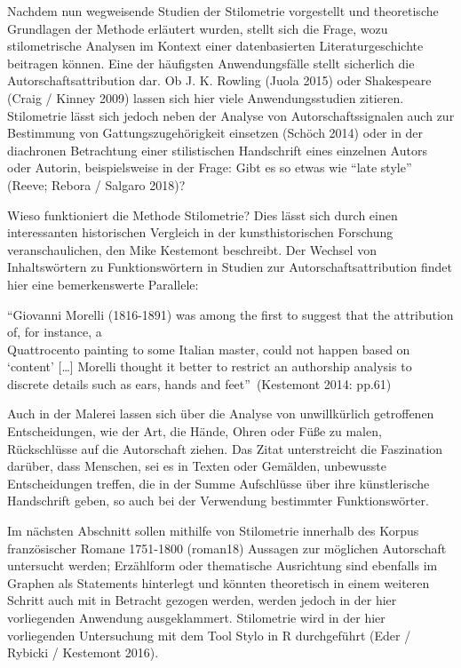 \documentclass[
  12pt,
  letterpaper,
  DIV=11,
  numbers=noendperiod]{scrreprt}
\begin{document}
Nachdem nun wegweisende Studien der Stilometrie vorgestellt und
theoretische Grundlagen der Methode erläutert wurden, stellt sich die
Frage, wozu stilometrische Analysen im Kontext einer datenbasierten
Literaturgeschichte beitragen können. Eine der häufigsten
Anwendungsfälle stellt sicherlich die Autorschaftsattribution dar. Ob J.
K. Rowling (Juola 2015) oder Shakespeare (Craig / Kinney 2009) lassen
sich hier viele Anwendungsstudien zitieren.\\
Stilometrie lässt sich jedoch neben der Analyse von Autorschaftssignalen
auch zur Bestimmung von Gattungszugehörigkeit einsetzen (Schöch 2014)
oder in der diachronen Betrachtung einer stilistischen Handschrift eines
einzelnen Autors oder Autorin, beispielsweise in der Frage: Gibt es so
etwas wie ``late style'' (Reeve; Rebora / Salgaro 2018)?

Wieso funktioniert die Methode Stilometrie? Dies lässt sich durch einen
interessanten historischen Vergleich in der kunsthistorischen Forschung
veranschaulichen, den Mike Kestemont beschreibt. Der Wechsel von
Inhaltswörtern zu Funktionswörtern in Studien zur
Autorschaftsattribution findet hier eine bemerkenswerte Parallele:

``Giovanni Morelli (1816-1891) was among the first to suggest that the
attribution of, for instance, a\\
Quattrocento painting to some Italian master, could not happen based on
`content' {[}\ldots{]} Morelli thought it better to restrict an
authorship analysis to discrete details such as ears, hands and
feet''~(Kestemont 2014: pp.61)

Auch in der Malerei lassen sich über die Analyse von unwillkürlich
getroffenen Entscheidungen, wie der Art, die Hände, Ohren oder Füße zu
malen, Rückschlüsse auf die Autorschaft ziehen. Das Zitat unterstreicht
die Faszination darüber, dass Menschen, sei es in Texten oder Gemälden,
unbewusste Entscheidungen treffen, die in der Summe Aufschlüsse über
ihre künstlerische Handschrift geben, so auch bei der Verwendung
bestimmter Funktionswörter.

Im nächsten Abschnitt sollen mithilfe von Stilometrie innerhalb des
Korpus französischer Romane 1751-1800 (roman18) Aussagen zur möglichen
Autorschaft untersucht werden; Erzählform oder thematische Ausrichtung
sind ebenfalls im Graphen als Statements hinterlegt und könnten
theoretisch in einem weiteren Schritt auch mit in Betracht gezogen
werden, werden jedoch in der hier vorliegenden Anwendung ausgeklammert.
Stilometrie wird in der hier vorliegenden Untersuchung mit dem Tool
Stylo in R durchgeführt (Eder / Rybicki / Kestemont 2016).
\end{document}
